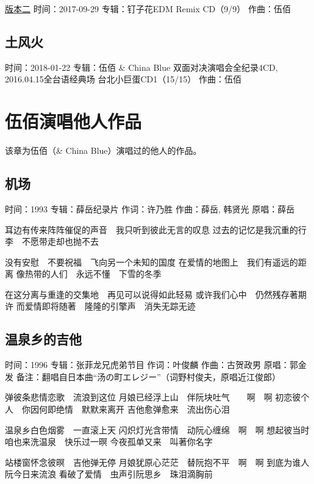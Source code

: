 \documentclass[UTF8,a4paper,oneside,twocolumn,12pt]{ctexbook}
\newcommand{\infopair}[2]{\textbullet #1：#2}
\newcommand{\zc}[1][伍佰]{\infopair{作词}{#1}}
\newcommand{\zq}[1][伍佰]{\infopair{作曲}{#1}}
\newcommand{\zj}[1]{\infopair{专辑}{#1}}
\newcommand{\yc}[1]{\infopair{原唱}{#1}}
\newcommand{\sj}[1]{\infopair{时间}{#1}}
\newcommand{\bz}[1]{\infopair{备注}{#1}}
\newenvironment{info}{\begin{flushleft}\kaishu
	}
	{\end{flushleft}\normalsize\yahei\par}
\newenvironment{lyric}{
	}
{}
\begin{document}
\begin{info}
	\underline{版本二}
	\sj{2017-09-29}
	\zj{钉子花EDM Remix CD（9/9）}
	\zq
\end{info}

\section{土风火}
\begin{info}
	\sj{2018-01-22}
	\zj{伍佰 \& China Blue 双面对决演唱会全纪录4CD,
		2016.04.15全台语经典场 台北小巨蛋CD1（15/15）}
	\zq
\end{info}

\chapter{伍佰演唱他人作品}
该章为伍佰（\& China Blue）演唱过的他人的作品。

\section{机场}
\begin{info}
	\sj{1993}
	\zj{薛岳纪录片}
	\zc[许乃胜]
	\zq[薛岳, 韩贤光]
	\yc{薛岳}
\end{info}
\begin{lyric}
	耳边有传来阵阵催促的声音　我只听到彼此无言的叹息
	过去的记忆是我沉重的行李　不愿带走却也抛不去

	没有安慰　不要祝福　飞向另一个未知的国度
	在爱情的地图上　我们有遥远的距离
	像热带的人们　永远不懂　下雪的冬季

	在这分离与重逢的交集地　再见可以说得如此轻易
	或许我们心中　仍然残存著期许
	而爱情即将随著　隆隆的引擎声　消失无踪无迹
\end{lyric}

\section{温泉乡的吉他}%
\begin{info}
	\sj{1996}
	\zj{张菲龙兄虎弟节目}
	\zc[叶俊麟]
	\zq[古贺政男]
	\yc{郭金发}
	\bz{翻唱自日本曲“汤の町エレジー”（词野村俊夫，原唱近江俊郎）}
\end{info}
\begin{lyric}
	弹彼条悲情恋歌　流浪到这位
	月娘已经浮上山　伴阮块吐气　　啊　啊
	初恋彼个人　你因何即绝情　默默来离开
	吉他愈弹愈来　流出伤心泪

	温泉乡白色烟雾　一直滚上天
	闪炽灯光含带情　动阮心缠绵　啊　啊
	想起彼当时　咱也来洗温泉　快乐过一暝
	今夜孤单又来　叫著你名字

	站楼窗怀念彼暝　吉他弹无停
	月娘犹原心茫茫　替阮抱不平　啊　啊
	到底为谁人　阮今日来流浪
	看破了爱情　虫声引阮思乡　珠泪滴胸前
\end{lyric}
\end{document}

